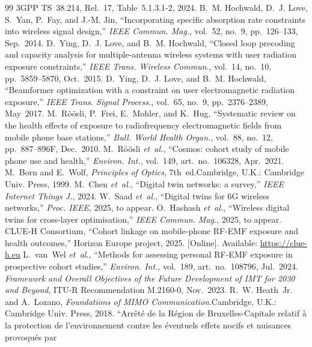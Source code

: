 \documentclass[journal,twocolumn,10pt]{IEEEtran}
\theoremstyle{plain}
\theoremstyle{definition}
\theoremstyle{remark}
\begin{document}
\begin{thebibliography}{99}
3GPP TS~38.214, Rel.~17, Table~5.1.3.1-2, 2024.
 B.~M. Hochwald, D.~J. Love, S.~Yan, P.~Fay,
and J.-M. Jin, ``Incorporating specific absorption rate constraints
into wireless signal design,'' \emph{IEEE Commun. Mag.}, vol.~52,
no.~9, pp.~126--133, Sep.~2014.
 D.~Ying, D.~J. Love, and B.~M. Hochwald, ``Closed
loop precoding and capacity analysis for multiple-antenna wireless
systems with user radiation exposure constraints,'' \emph{IEEE
Trans. Wireless Commun.}, vol.~14, no.~10, pp.~5859--5870,
Oct.~2015.
 D.~Ying, D.~J. Love, and B.~M. Hochwald,
``Beamformer optimization with a constraint on user electromagnetic
radiation exposure,'' \emph{IEEE Trans. Signal Process.}, vol.~65,
no.~9, pp.~2376--2389, May~2017.
 M.~R\"o\"osli, P.~Frei, E.~Mohler, and K.~Hug,
``Systematic review on the health effects of exposure to
radiofrequency electromagnetic fields from mobile phone base
stations,'' \emph{Bull. World Health Organ.}, vol.~88, no.~12,
pp.~887--896F, Dec.~2010.
 M.~R\"o\"osli \emph{et~al.}, ``Cosmos: cohort
study of mobile phone use and health,'' \emph{Environ. Int.},
vol.~149, art.~no.~106328, Apr.~2021.
 M.~Born and E.~Wolf, \emph{Principles of
Optics}, 7th~ed.\quad Cambridge, U.K.: Cambridge Univ. Press,
1999.
 M.~Chen \emph{et~al.}, ``Digital twin
networks: a survey,'' \emph{IEEE Internet Things J.}, 2024.
 W.~Saad \emph{et~al.}, ``Digital twins for
6G wireless networks,'' \emph{Proc. IEEE}, 2025, to appear.
 O.~Hashash \emph{et~al.}, ``Wireless
digital twins for cross-layer optimisation,'' \emph{IEEE Commun.
Mag.}, 2025, to appear.
 CLUE-H Consortium, ``Cohort linkage on
mobile-phone RF-EMF exposure and health outcomes,'' Horizon Europe
project, 2025. [Online]. Available: \url{https://clue-h.eu}
 L.~van~Wel \emph{et~al.}, ``Methods for
assessing personal RF-EMF exposure in prospective cohort studies,''
\emph{Environ. Int.}, vol.~189, art.~no.~108796, Jul.~2024.
 \emph{Framework and Overall Objectives of the
Future Development of IMT for 2030 and Beyond}, ITU-R
Recommendation M.2160-0, Nov.~2023.
 R.~W. Heath~Jr. and A.~Lozano,
\emph{Foundations of MIMO Communication}.\quad Cambridge, U.K.:
Cambridge Univ. Press, 2018.
 ``Arr\^et\'e de la R\'egion de
Bruxelles-Capitale relatif \`a la protection de l'environnement
contre les \'eventuels effets nocifs et nuisances provoqu\'es par

\end{thebibliography}
\end{document}
